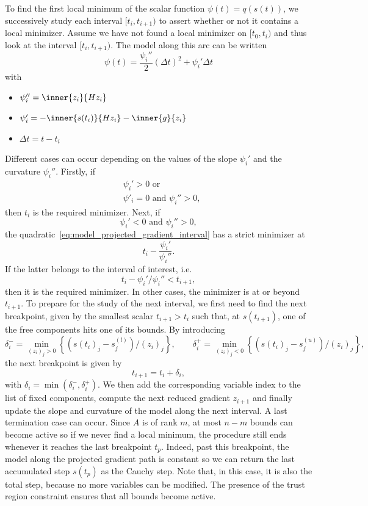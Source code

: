 To find the first local minimum of the scalar function $\psi(t) = q(s(t))$, we successively study each interval $[t_i,t_{i+1})$ to assert whether or not it contains a local minimizer.
Assume we have not found a local minimizer on $[t_0,t_i)$ and thus look at the interval $[t_i,t_{i+1})$. The model along this arc can be written
\begin{equation}\label{eq:model_projected_gradient_interval}
	\psi(t) = \dfrac{\psi_i''}{2}(\Delta t)^2 + \psi_i'\Delta t
\end{equation}
with
\begin{itemize}
	\item $\psi_i'' = \inner{z_i}{Hz_i}$
	\item $\psi_i' = -\inner{s(t_i)}{Hz_i} - \inner{g}{z_i}$
	\item $\Delta t = t-t_i$
\end{itemize}
Different cases can occur depending on the values of the slope $\psi_i'$ and the curvature $\psi_i''$. 
Firstly, if
\begin{align*}
	&\psi_i' > 0 \text{ or } \\
	&\psi'_i=0 \text{ and } \psi_i'' > 0,
\end{align*}
then $t_i$ is the required minimizer. Next, if
\[\psi_i' < 0 \text{ and } \psi_i'' > 0,\]
the quadratic~\eqref{eq:model_projected_gradient_interval} has a strict minimizer at
\[t_i- \dfrac{\psi_i'}{\psi_i''}.\]
If the latter belongs to the interval of interest, i.e. 
\[t_i-\psi_i'/\psi_i'' < t_{i+1},\]
then it is the required minimizer. In other cases, the minimizer is at or beyond $t_{i+1}$. To prepare for the study of the next interval, we first need to find the next breakpoint, given by the smallest scalar $t_{i+1}>t_i$ such that, at $s(t_{i+1})$, one of the free components hits one of its bounds. By introducing
\[\delta_i^- = \min_{(z_i)_j > 0} \left\{ (s(t_i)_j - s^{(l)}_j)/(z_i)_j\right\}, \qquad \delta_i^+ = \min_{(z_i)_j < 0} \left\{(s(t_i)_j - s^{(u)}_j)/(z_i)_j\right\},\]
the next breakpoint is given by 
\begin{equation}\label{eq:next_breakpoint}
	t_{i+1} = t_i + \delta_i,
\end{equation} 
with $\delta_i = \min\left(\delta_i^-,\delta_i^+\right)$. We then add the corresponding variable index to the list of fixed components, compute the next reduced gradient $z_{i+1}$ and finally update the slope and curvature of the model along the next interval. A last termination case can occur. Since $A$ is of rank $m$, at most $n-m$ bounds can become active so if we never find a local minimum, the procedure still ends whenever it reaches the last breakpoint $t_{p}$. Indeed, past this breakpoint, the model along the projected gradient path is constant so we can return the last accumulated step $s(t_p)$ as the Cauchy step. Note that, in this case, it is also the total step, because no more variables can be modified. The presence of the trust region constraint ensures that all bounds become active. 
